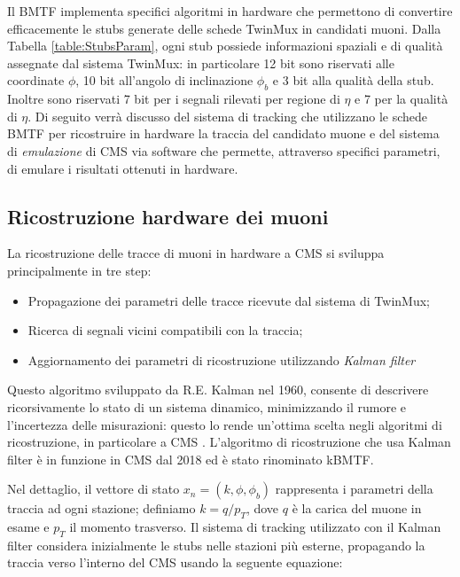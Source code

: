Il BMTF implementa specifici algoritmi in hardware che permettono di convertire efficacemente le stubs generate delle schede TwinMux in candidati muoni. Dalla Tabella \ref{table:StubsParam}, ogni stub possiede informazioni spaziali e di qualità assegnate dal sistema TwinMux: in particolare 12 bit sono riservati alle coordinate $\phi$, 10 bit all'angolo di inclinazione $\phi_b$ e 3 bit alla qualità della stub. Inoltre sono riservati 7 bit per i segnali rilevati per regione di $\eta$ e 7 per la qualità di $\eta$. Di seguito verrà discusso del sistema di tracking che utilizzano le schede BMTF per ricostruire in hardware la traccia del candidato muone e del sistema di \textit{emulazione} di CMS via software che permette, attraverso specifici parametri, di emulare i risultati ottenuti in hardware.

\subsection{Ricostruzione hardware dei muoni}
\label{sec:KalmannFilter}

La ricostruzione delle tracce di muoni in hardware a CMS si sviluppa principalmente in tre step: 
\begin{itemize}
  \item Propagazione dei parametri delle tracce ricevute dal sistema di TwinMux;
  \item Ricerca di segnali vicini compatibili con la traccia;
  \item Aggiornamento dei parametri di ricostruzione utilizzando \textit{Kalman filter} \cite{Summers:2728522}
\end{itemize}

Questo algoritmo sviluppato da R.E. Kalman nel 1960, consente di descrivere ricorsivamente lo stato di un sistema dinamico, minimizzando il rumore e l'incertezza delle misurazioni: questo lo rende un'ottima scelta negli algoritmi di ricostruzione, in particolare a CMS \cite{welch1995introduction}. L'algoritmo di ricostruzione che usa Kalman filter è in funzione in CMS dal 2018 ed è stato rinominato kBMTF. 

Nel dettaglio, il vettore di stato $x_n = (k, \phi, \phi_b)$ rappresenta i parametri della traccia ad ogni stazione; definiamo $k = q/p_T$, dove $q$ è la carica del muone in esame e $p_T$ il momento trasverso. Il sistema di tracking utilizzato con il Kalman filter considera inizialmente le stubs nelle stazioni più esterne, propagando la traccia verso l'interno del CMS usando la seguente equazione:

